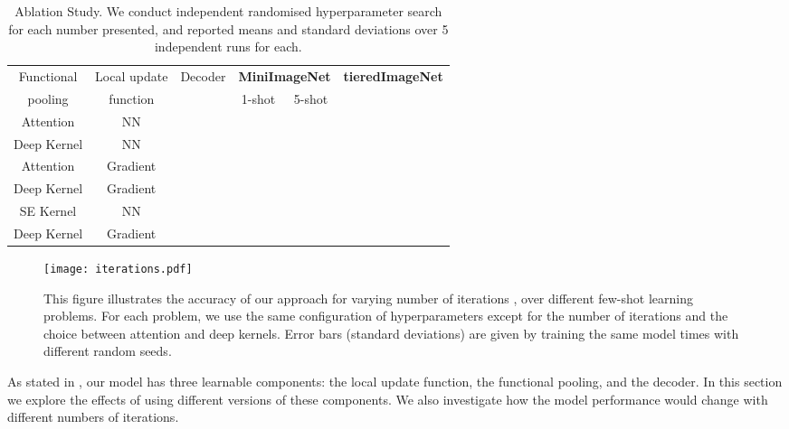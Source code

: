 \documentclass{article}
\theoremstyle{definition}
\newcommand{\cmark}{\ding{51}}\newcommand{\xmark}{\ding{55}}
\begin{document}
\begin{table*}[!htb] 
  \centering
  \footnotesize
  \begin{threeparttable}[]
  \caption{Ablation Study. We conduct independent randomised hyperparameter search for each number presented, and reported means and standard deviations over 5 independent runs for each.}
  \label{table:few_shot}
  \begin{tabular}{ccc|cc|cc}
    \toprule
    Functional &  Local update &  \multirow{2}{*}{Decoder} &  \multicolumn{2}{c|}{\textbf{MiniImageNet}} & \multicolumn{2}{c}{\textbf{tieredImageNet}} \\ 
     pooling &  function &  & 1-shot   & 5-shot \\
    \midrule
    Attention & NN & \cmark & \bm{} &  & \bm{} &   \\
    Deep Kernel & NN& \cmark &  & \bm{} &  & \bm{} \\
    Attention & Gradient & \cmark &  &   &  &  \\
    Deep Kernel & Gradient & \cmark &  &  &  &  \\
    \midrule
    SE Kernel & NN & \cmark &  &   &  &  \\
    Deep Kernel & Gradient & \xmark &  &  &  &  \\
    \bottomrule
  \end{tabular}
  \label{tb:ablation}
  \end{threeparttable}
\end{table*}

\begin{figure*}
    \texttt{[image: iterations.pdf]}
    \caption{This figure illustrates the accuracy of our approach for varying number of iterations , over different few-shot learning problems. For each problem, we use the same configuration of hyperparameters except for the number of iterations and the choice between attention and deep kernels. Error bars (standard deviations) are given by training the same model  times with different random seeds.}
\label{fig:iteration}
\end{figure*}


As stated in , our model has three learnable components: the local update function, the functional pooling, and the decoder. In this section we explore the effects of using different versions of these components. We also investigate how the model performance would change with different numbers of iterations.
\end{document}
